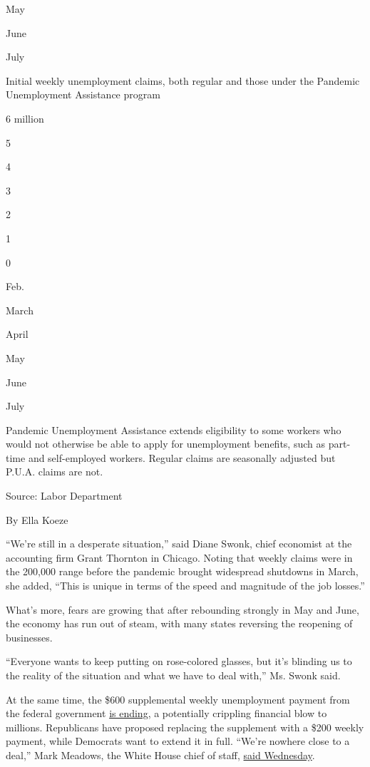 May

June

July

Initial weekly unemployment claims, both regular and those under the
Pandemic Unemployment Assistance program

6 million

5

4

3

2

1

0

Feb.

March

April

May

June

July

Pandemic Unemployment Assistance extends eligibility to some workers who
would not otherwise be able to apply for unemployment benefits, such as
part-time and self-employed workers. Regular claims are seasonally
adjusted but P.U.A. claims are not.

Source: Labor Department

By Ella Koeze

``We're still in a desperate situation,'' said Diane Swonk, chief
economist at the accounting firm Grant Thornton in Chicago. Noting that
weekly claims were in the 200,000 range before the pandemic brought
widespread shutdowns in March, she added, ``This is unique in terms of
the speed and magnitude of the job losses.''

What's more, fears are growing that after rebounding strongly in May and
June, the economy has run out of steam, with many states reversing the
reopening of businesses.

``Everyone wants to keep putting on rose-colored glasses, but it's
blinding us to the reality of the situation and what we have to deal
with,'' Ms. Swonk said.

At the same time, the \$600 supplemental weekly unemployment payment
from the federal government
\href{https://www.nytimes3xbfgragh.onion/2020/07/29/business/economy/unemployment-benefits-coronavirus.html}{is
ending}, a potentially crippling financial blow to millions. Republicans
have proposed replacing the supplement with a \$200 weekly payment,
while Democrats want to extend it in full. ``We're nowhere close to a
deal,'' Mark Meadows, the White House chief of staff,
\href{https://www.nytimes3xbfgragh.onion/2020/07/29/business/economy/virus-aid-trump.html}{said
Wednesday}.


